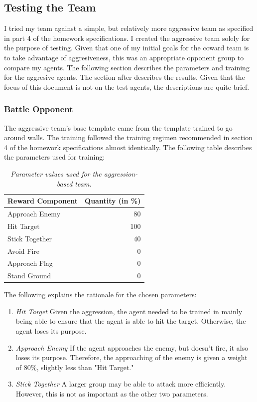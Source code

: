\documentclass{article} %
\begin{document}
\subsection{Testing the Team}

I tried my team against a simple, but relatively more aggressive team as specified in part 4 of the homework specifications. I created the aggressive team solely for the purpose of testing. Given that one of my initial goals for the coward team is to take advantage of aggresiveness, this was an appropriate opponent group to compare my agents. The following section  describes the parameters and training for the aggresive agents. The section after describes the results. Given that the focus of this document is not on the test agents, the descriptions are quite brief.

\subsubsection{Battle Opponent}

The aggressive team's base template came from the template trained to go around walls. The training followed the training regimen recommended in section 4 of the homework specifications almost identically. The following table describes the parameters used for training:

\begin{table}[H]
  \centering
  \begin{tabular}{l|r}
  Reward Component & Quantity (in \%) \\\hline
  Approach Enemy & 80 \\
  Hit Target & 100 \\
  Stick Together & 40 \\
  Avoid Fire & 0 \\
  Approach Flag & 0 \\
  Stand Ground & 0 
  \end{tabular}
  \caption{\label{tab:widgets}\textit{Parameter values used for the aggression-based team.}}
\end{table}

The following explains the rationale for the chosen parameters:

\begin{enumerate}
\item \textit{Hit Target} Given the aggression, the agent needed to be trained in mainly being able to ensure that the agent is able to hit the target. Otherwise, the agent loses its purpose. 
\item \textit{Approach Enemy} If the agent approaches the enemy, but doesn't fire, it also loses its purpose. Therefore, the approaching of the enemy is given a weight of 80\%, slightly less than "Hit Target."  
\item \textit{Stick Together} A larger group may be able to attack more efficiently. However, this is not as important as the other two parameters.   
\end{enumerate}
\end{document}
